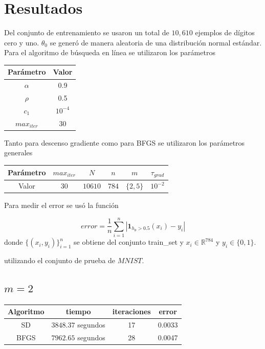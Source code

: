 \documentclass[11pt,letterpaper]{article}
\theoremstyle{definition}
\theoremstyle{definition}
\theoremstyle{definition}
\begin{document}
\section{Resultados}
Del conjunto de entrenamiento se usaron un total de $ 10,610 $ ejemplos de dígitos cero y uno. $ \theta_0 $ se generó de manera aleatoria de una distribución normal estándar. Para el algoritmo de búsqueda en línea se utilizaron los parámetros
\begin{center}
	\begin{tabular}{cc}
		\hline
		Parámetro & Valor \\
		\hline
		$\alpha $ & 0.9 \\
		$ \rho $  & 0.5 \\
		$ c_1 $ & $ 10^{-4} $ \\
		$ max_{iter} $  & $30 $ \\
		\hline
	\end{tabular}
\end{center}
Tanto para descenso gradiente como para BFGS se utilizaron los parámetros generales
\begin{center}
	\begin{tabular}{cccccc}
		\hline
		Parámetro & $ max_{iter} $ & $ N $ & $ n $ & $ m $ & $ \tau_{grad} $ \\
		\hline
		Valor    &      30     & $ 10610 $ & $ 784 $ & $ \{2,5\} $ &$ 10^{-2} $  \\
		\hline
	\end{tabular}
\end{center}
Para medir el error se usó la función
\begin{shaded*}
	$$ error = \dfrac{1}{n} \sum_{i=1}^n | \textbf{1} _{h_\theta > 0.5 }(x_i) - y_i | $$
	donde $ \{ (x_i, y_i) \}_{i = 1} ^n  $ se obtiene del conjunto train\_set y $ x_i \in \mathbb{R}^{784} $ y $ y_i \in \{ 0, 1\} $.
\end{shaded*}
utilizando el conjunto de prueba de $ MNIST $.
\subsection{$ m = 2 $}
\begin{center}
	\begin{tabular}{cccc}
		\hline
		Algoritmo & tiempo & iteraciones  & error \\
		\hline
		SD   & $ 3848.37 $ segundos & 17 & 0.0033  \\
		BFGS & $7962.65 $ segundos  & 28 & 0.0047 \\
		\hline
	\end{tabular}
\end{center}
\end{document}
